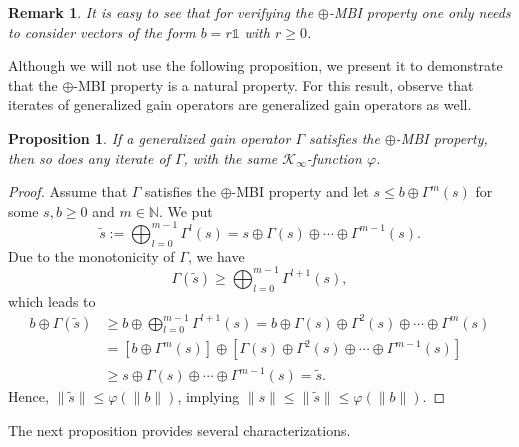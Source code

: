 \documentclass[10pt, oneside, a4paper]{article}
\newcommand{\N}{\mathbb{N}}
\newcommand{\unit}{\mathds{1}}
\newcommand{\KC}{\mathcal{K}}
\newtheorem{proposition}{Proposition}[section]
\newtheorem{remark}{Remark}[section]
\begin{document}
\begin{remark}
It is easy to see that for verifying the $\oplus$-MBI property one only needs to consider vectors of the form $b = r\unit$ with $r \geq 0$.
\end{remark}

Although we will not use the following proposition, we present it to demonstrate that the $\oplus$-MBI property is a natural property. For this result, observe that iterates of generalized gain operators are generalized gain operators as well.

\begin{proposition}
If a generalized gain operator $\Gamma$ satisfies the $\oplus$-MBI property, then so does any iterate of $\Gamma$, with the same $\KC_{\infty}$-function $\varphi$.
\end{proposition}

\begin{proof}
Assume that $\Gamma$ satisfies the $\oplus$-MBI property and let $s \leq b \oplus \Gamma^m(s)$ for some $s,b \geq 0$ and $m \in \N$. We put%
\begin{equation}\label{eq_def_tildes}
  \tilde{s} := \bigoplus_{l=0}^{m-1} \Gamma^l(s) = s \oplus \Gamma(s) \oplus \cdots \oplus \Gamma^{m-1}(s).%
\end{equation}
Due to the monotonicity of $\Gamma$, we have%
\begin{equation*}
  \Gamma(\tilde{s}) \geq \bigoplus_{l=0}^{m-1} \Gamma^{l + 1}(s),%
\end{equation*}
which leads to%
\begin{align*}
  b \oplus \Gamma(\tilde{s}) &\geq b \oplus \bigoplus_{l=0}^{m-1} \Gamma^{l + 1}(s) = b \oplus \Gamma(s) \oplus \Gamma^2(s) \oplus \cdots \oplus \Gamma^m(s) \\
																&= \left[ b \oplus \Gamma^m(s) \right] \oplus \left[ \Gamma(s) \oplus \Gamma^2(s) \oplus \cdots \oplus \Gamma^{m-1}(s) \right] \\
																&\geq s \oplus \Gamma(s) \oplus \cdots \oplus \Gamma^{m-1}(s) = \tilde{s}.%
\end{align*}
Hence, $\|\tilde{s}\| \leq \varphi(\|b\|)$, implying $\|s\| \leq \|\tilde{s}\| \leq \varphi(\|b\|)$.
\end{proof}

The next proposition provides several characterizations.%
\end{document}

